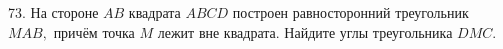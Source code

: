 73. На стороне $AB$ квадрата $ABCD$ построен равносторонний треугольник $MAB,$ причём точка $M$ лежит вне квадрата. Найдите углы треугольника $DMC.$\\
